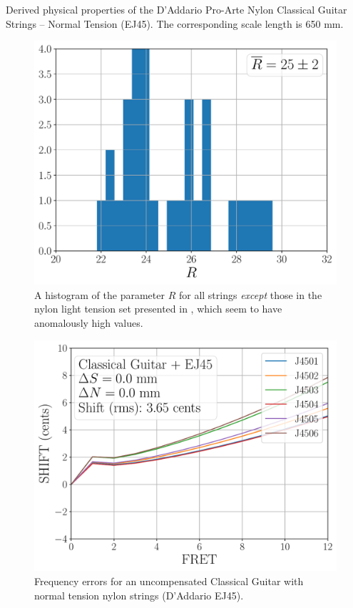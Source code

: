 \begin{table}%
  \centering
  \caption{\label{tbl:ej45_props} Derived physical properties of the D'Addario Pro-Arte Nylon Classical Guitar Strings -- Normal Tension (EJ45). The corresponding scale length is 650 mm.}
  
\end{table}%

\begin{figure}
  \centering
  \includegraphics[width=5.0in]{../figures/hist_r}
  \caption{\label{fig:hist_r} A histogram of the parameter $R$ for all strings \emph{except} those in the nylon light tension set presented in , which seem to have anomalously high values.}
\end{figure}

\begin{figure}
  \centering
  \includegraphics[width=5.0in]{../figures/shift_classicalguitar_ej45_null}
  \caption{\label{fig:shift_classicalguitar_ej45_null} Frequency errors for an uncompensated Classical Guitar with normal tension nylon strings (D'Addario EJ45).}
\end{figure}

